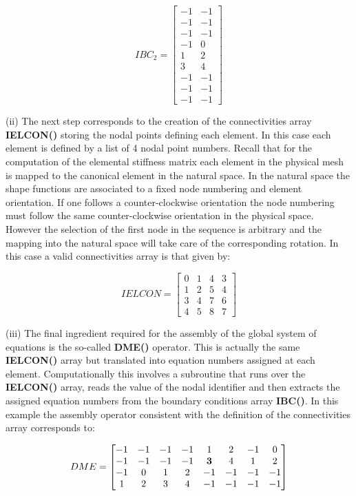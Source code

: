 \[IBC_2 = \begin{bmatrix}
-1 & -1\\
-1 & -1\\
-1 & -1\\
-1 & 0\\
1 & 2\\
3 & 4\\
-1 & -1\\
-1 & -1\\
-1 & -1
\end{bmatrix}\]


(ii) The next step corresponds to the creation of the connectivities array {\bf IELCON()} storing the nodal points defining each element. In this case each element is defined by a list of 4 nodal point numbers. Recall that for the computation of the elemental stiffness matrix each element in the physical mesh is mapped to the canonical element in the natural space. In the natural space the shape functions are associated to a fixed node numbering and element orientation. If one follows a counter-clockwise orientation the node numbering must follow the same counter-clockwise orientation in the physical space. However the selection of the first node in the sequence is arbitrary and the mapping into the natural space will take care of the corresponding rotation. In this case a valid connectivities array is that given by:


\[IELCON = \begin{bmatrix}
0 &1 &4 &3\\
1 &2 &5 &4\\
3 &4 &7 &6\\
4 &5 &8 &7
\end{bmatrix}\]

(iii) The final ingredient required for the assembly of the global system of equations is the so-called {\bf DME()} operator. This is actually the same {\bf IELCON()} array but translated into equation numbers assigned at each element. Computationally this involves a subroutine that runs over the {\bf IELCON()} array, reads the value of the nodal identifier and then extracts the assigned equation numbers from the boundary conditions array {\bf IBC()}. In this example the assembly operator consistent with the definition of the connectivities array corresponds to:

\[DME = \begin{bmatrix}
-1 &-1 &-1 &-1 &1 &2 &-1 &0\\
-1 &-1 &-1&-1 &{\bf 3} &4 &1 &2\\
-1 &0 &1 &2 &-1 &-1 &-1 &-1\\
1 &2 &3 &4 &-1 &-1 &-1 &-1
\end{bmatrix}\]

